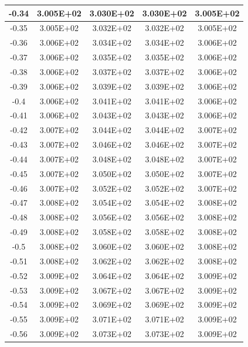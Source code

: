 \documentclass{article}
\begin{document}
\begin{center}
\begin{longtable}{|c|c|c|c|c|}
            -0.34 & 3.005E+02 & 3.030E+02 & 3.030E+02 & 3.005E+02 \\ \hline
            -0.35 & 3.005E+02 & 3.032E+02 & 3.032E+02 & 3.005E+02 \\ \hline
            -0.36 & 3.006E+02 & 3.034E+02 & 3.034E+02 & 3.006E+02 \\ \hline
            -0.37 & 3.006E+02 & 3.035E+02 & 3.035E+02 & 3.006E+02 \\ \hline
            -0.38 & 3.006E+02 & 3.037E+02 & 3.037E+02 & 3.006E+02 \\ \hline
            -0.39 & 3.006E+02 & 3.039E+02 & 3.039E+02 & 3.006E+02 \\ \hline
            -0.4 & 3.006E+02 & 3.041E+02 & 3.041E+02 & 3.006E+02 \\ \hline
            -0.41 & 3.006E+02 & 3.043E+02 & 3.043E+02 & 3.006E+02 \\ \hline
            -0.42 & 3.007E+02 & 3.044E+02 & 3.044E+02 & 3.007E+02 \\ \hline
            -0.43 & 3.007E+02 & 3.046E+02 & 3.046E+02 & 3.007E+02 \\ \hline
            -0.44 & 3.007E+02 & 3.048E+02 & 3.048E+02 & 3.007E+02 \\ \hline
            -0.45 & 3.007E+02 & 3.050E+02 & 3.050E+02 & 3.007E+02 \\ \hline
            -0.46 & 3.007E+02 & 3.052E+02 & 3.052E+02 & 3.007E+02 \\ \hline
            -0.47 & 3.008E+02 & 3.054E+02 & 3.054E+02 & 3.008E+02 \\ \hline
            -0.48 & 3.008E+02 & 3.056E+02 & 3.056E+02 & 3.008E+02 \\ \hline
            -0.49 & 3.008E+02 & 3.058E+02 & 3.058E+02 & 3.008E+02 \\ \hline
            -0.5 & 3.008E+02 & 3.060E+02 & 3.060E+02 & 3.008E+02 \\ \hline
            -0.51 & 3.008E+02 & 3.062E+02 & 3.062E+02 & 3.008E+02 \\ \hline
            -0.52 & 3.009E+02 & 3.064E+02 & 3.064E+02 & 3.009E+02 \\ \hline
            -0.53 & 3.009E+02 & 3.067E+02 & 3.067E+02 & 3.009E+02 \\ \hline
            -0.54 & 3.009E+02 & 3.069E+02 & 3.069E+02 & 3.009E+02 \\ \hline
            -0.55 & 3.009E+02 & 3.071E+02 & 3.071E+02 & 3.009E+02 \\ \hline
            -0.56 & 3.009E+02 & 3.073E+02 & 3.073E+02 & 3.009E+02 \\ \hline

\end{longtable}
\end{center}
\end{document}

